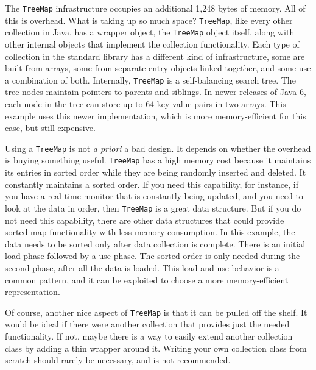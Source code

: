 The \texttt{TreeMap} infrastructure occupies an additional 1,248 bytes of memory. All of this is overhead. What is taking up so much space?  \texttt{TreeMap}, like every other collection in Java, has a wrapper object, the \texttt{TreeMap} object itself, along with other internal objects that implement the collection functionality. Each type of collection in the standard library has a different kind of infrastructure, some are built from arrays, some from separate entry objects linked together, and some use a combination of both. Internally, \texttt{TreeMap} is a self-balancing search tree. The tree nodes maintain pointers to parents and siblings.  In newer releases of Java 6, each node in the tree can store up to 64 key-value pairs in two arrays. This example uses this newer implementation, which is more memory-efficient for this case, but still expensive. 

Using a \texttt{TreeMap} is not \textit{a priori} a bad design. It depends on whether the overhead is buying something useful. \texttt{TreeMap} has a high memory cost because it maintains its entries in sorted order while they are being randomly inserted and deleted. It constantly maintains a sorted order. If you need this capability, for instance, if you have a real time monitor that is constantly being updated, and you need to look at the data in order, then \texttt{TreeMap} is a great data structure.  But if you do not need this capability, there are other data structures that could provide sorted-map functionality with less memory consumption. In this example, the data needs to be sorted only after data collection is complete. There is an initial load phase followed by a use phase. The sorted order is only needed during the second phase, after all the data is loaded. This load-and-use behavior is a common pattern, and it can be exploited to choose a more memory-efficient representation.

Of course, another nice aspect of \texttt{TreeMap} is that it can be pulled off the shelf. It would be ideal if there were another collection that provides just the needed functionality. If not, maybe there is a way to easily extend another collection class by adding a thin wrapper around it. Writing your own collection class from scratch should rarely be necessary, and is not recommended.

